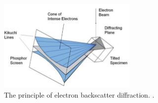 \begin{figure}
	\centering
	\includegraphics[width=0.6\textwidth]{img/ebsd_principle}
	\caption{The principle of electron backscatter diffraction. \cite{schwartz2009electron}.}
	\label{ebsd-principle}
\end{figure}

